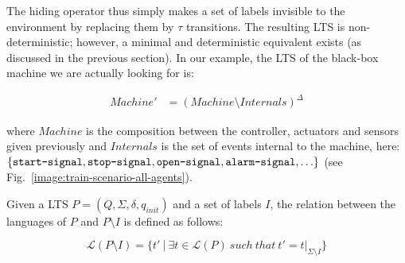 The hiding operator thus simply makes a set of labels invisible to the environment by replacing them by $\tau$ transitions. The resulting LTS is non-deterministic; however, a minimal and deterministic equivalent exists (as discussed in the previous section). In our example, the LTS of the black-box machine we are actually looking for is:

\vspace{-0.8cm}
\begin{align}
Machine' &= (Machine \setminus Internals)^\Delta
\end{align}
\vspace{-0.8cm}

\noindent where $Machine$ is the composition between the controller, actuators and sensors given previously and $Internals$ is the set of events internal to the machine, here: $\{\texttt{start-signal}, \texttt{stop-signal}, \texttt{open-signal}, \texttt{alarm-signal}, \ldots\}$ (see Fig.~\ref{image:train-scenario-all-agents}).

Given a LTS $P = (Q,\Sigma,\delta,q_{init})$ and a set of labels $I$, the relation between the languages of $P$ and $P \setminus I$ is defined as follows:

\begin{equation}
\mathcal{L}(P \setminus I) = \{ t'~|~\exists t \in \mathcal{L}(P)~such~that~t' = t|_{\Sigma \setminus I}\}
\end{equation}

